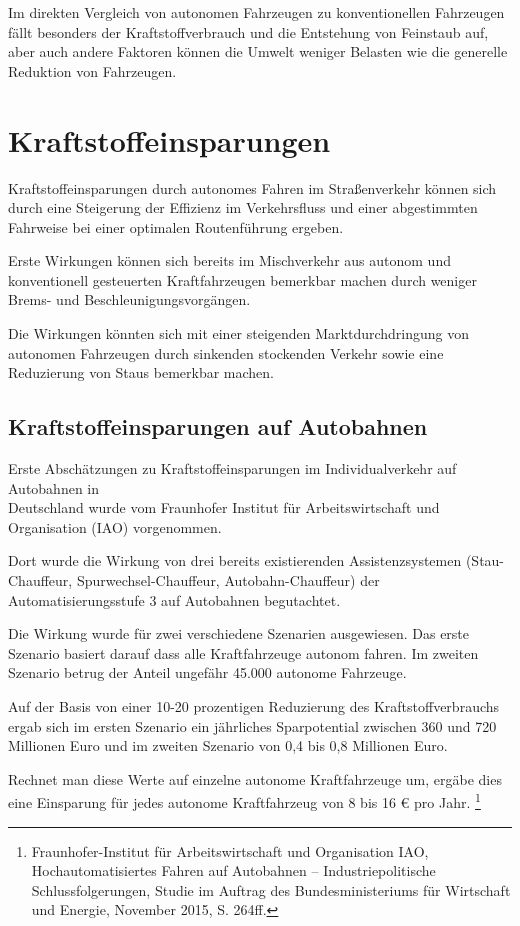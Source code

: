 Im direkten Vergleich von autonomen Fahrzeugen zu konventionellen Fahrzeugen fällt besonders der Kraftstoffverbrauch und die Entstehung von Feinstaub auf,
aber auch andere Faktoren können die Umwelt weniger Belasten wie die generelle Reduktion von Fahrzeugen.

\section{Kraftstoffeinsparungen}
Kraftstoffeinsparungen durch autonomes Fahren im Straßenverkehr können sich durch
eine Steigerung der Effizienz im Verkehrsfluss und
einer abgestimmten Fahrweise bei einer optimalen Routenführung ergeben.

Erste Wirkungen können sich bereits im Mischverkehr aus autonom und konventionell gesteuerten Kraftfahrzeugen bemerkbar machen durch weniger
Brems- und Beschleunigungsvorgängen.

Die Wirkungen könnten sich mit einer steigenden Marktdurchdringung von autonomen Fahrzeugen
durch sinkenden stockenden Verkehr sowie eine Reduzierung von Staus bemerkbar machen.

\subsection{Kraftstoffeinsparungen auf Autobahnen}
Erste Abschätzungen zu Kraftstoff\-einsparungen im Individualverkehr auf Autobahnen in\\
Deutschland wurde vom Fraunhofer
Institut für Arbeitswirtschaft und Organisation (IAO) vorgenommen.

Dort wurde die Wirkung von drei bereits existierenden Assistenzsystemen (Stau-Chauffeur, Spurwechsel-Chauffeur, Autobahn-Chauffeur)
der Automatisierungsstufe 3 auf Autobahnen begutachtet.

Die Wirkung wurde für zwei verschiedene Szenarien ausgewiesen.
Das erste Szenario basiert darauf dass alle Kraftfahrzeuge autonom fahren.
Im zweiten Szenario betrug der Anteil ungefähr 45.000 autonome Fahrzeuge.

Auf der Basis von einer 10-20 prozentigen Reduzierung des Kraftstoffverbrauchs ergab sich
im ersten Szenario ein jährliches Sparpotential zwischen 360 und 720 Millionen Euro und
im zweiten Szenario von 0,4 bis 0,8 Millionen Euro.

Rechnet man diese Werte auf einzelne autonome Kraftfahrzeuge um,
ergäbe dies eine Einsparung für jedes autonome Kraftfahrzeug von 8 bis 16 € pro Jahr.
\footnote{Fraunhofer-Institut für Arbeitswirtschaft und Organisation IAO, Hochautomatisiertes
	Fahren auf Autobahnen – Industriepolitische Schlussfolgerungen, Studie im Auftrag des
	Bundesministeriums für Wirtschaft und Energie, November 2015, S. 264ff.}

